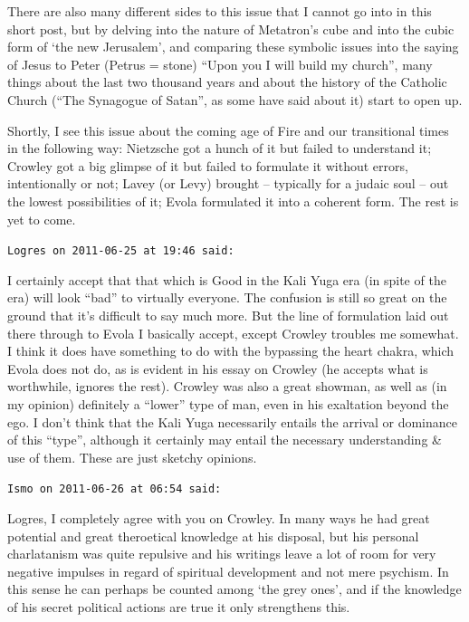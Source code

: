 \begin{footnotesize}
\begin{sffamily}
There are also many different sides to this issue that I cannot go into in this short post, but by delving into the nature of Metatron's cube and into the cubic form of `the new Jerusalem', and comparing these symbolic issues into the saying of Jesus to Peter (Petrus = stone) ``Upon you I will build my church'', many things about the last two thousand years and about the history of the Catholic Church (``The Synagogue of Satan'', as some have said about it) start to open up.

Shortly, I see this issue about the coming age of Fire and our transitional times in the following way: Nietzsche got a hunch of it but failed to understand it; Crowley got a big glimpse of it but failed to formulate it without errors, intentionally or not; Lavey (or Levy) brought -- typically for a judaic soul -- out the lowest possibilities of it; Evola formulated it into a coherent form. The rest is yet to come.

\hfill

\texttt{Logres on 2011-06-25 at 19:46 said:}

I certainly accept that that which is Good in the Kali Yuga era (in spite of the era) will look ``bad'' to virtually everyone. The confusion is still so great on the ground that it's difficult to say much more. But the line of formulation laid out there through to Evola I basically accept, except Crowley troubles me somewhat. I think it does have something to do with the bypassing the heart chakra, which Evola does not do, as is evident in his essay on Crowley (he accepts what is worthwhile, ignores the rest). Crowley was also a great showman, as well as (in my opinion) definitely a ``lower'' type of man, even in his exaltation beyond the ego. I don't think that the Kali Yuga necessarily entails the arrival or dominance of this ``type'', although it certainly may entail the necessary understanding \& use of them. These are just sketchy opinions.

\hfill

\texttt{Ismo on 2011-06-26 at 06:54 said:}

Logres, I completely agree with you on Crowley. In many ways he had great potential and great theroetical knowledge at his disposal, but his personal charlatanism was quite repulsive and his writings leave a lot of room for very negative impulses in regard of spiritual development and not mere psychism. In this sense he can perhaps be counted among `the grey ones', and if the knowledge of his secret political actions are true it only strengthens this.


\end{sffamily}
\end{footnotesize}
